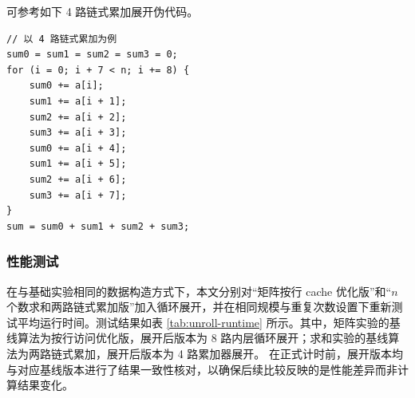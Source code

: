 ﻿\documentclass[UTF8,a4paper,12pt]{ctexart}
\begin{document}
可参考如下 4 路链式累加展开伪代码。
\begin{lstlisting}[caption={4路链式累加循环展开示意代码}]
// 以 4 路链式累加为例
sum0 = sum1 = sum2 = sum3 = 0;
for (i = 0; i + 7 < n; i += 8) {
    sum0 += a[i];
    sum1 += a[i + 1];
    sum2 += a[i + 2];
    sum3 += a[i + 3];
    sum0 += a[i + 4];
    sum1 += a[i + 5];
    sum2 += a[i + 6];
    sum3 += a[i + 7];
}
sum = sum0 + sum1 + sum2 + sum3;
\end{lstlisting}

\subsubsection{性能测试}
在与基础实验相同的数据构造方式下，本文分别对“矩阵按行 cache 优化版”和“\(n\) 个数求和两路链式累加版”加入循环展开，并在相同规模与重复次数设置下重新测试平均运行时间。测试结果如表 \ref{tab:unroll-runtime} 所示。其中，矩阵实验的基线算法为按行访问优化版，展开后版本为 8 路内层循环展开；求和实验的基线算法为两路链式累加，展开后版本为 4 路累加器展开。
在正式计时前，展开版本均与对应基线版本进行了结果一致性核对，以确保后续比较反映的是性能差异而非计算结果变化。

\begin{table}[H]
    \centering
    \fontsize{8.1pt}{8.5pt}\selectfont
    \setlength{\tabcolsep}{3.0pt}
    \renewcommand{\arraystretch}{0.98}
    \caption{循环展开优化性能测试结果}
    \label{tab:unroll-runtime}
\end{table}
\end{document}
